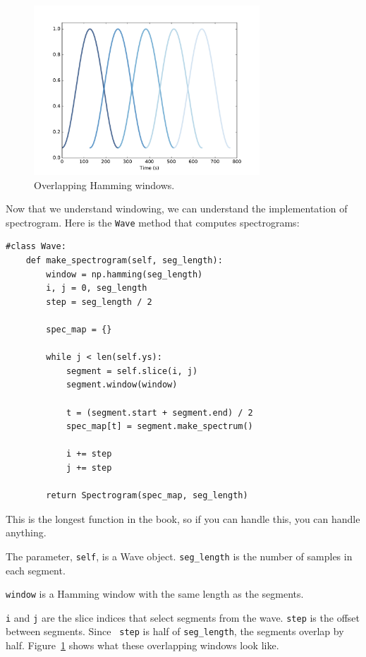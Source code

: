 \documentclass[12pt]{book}
\begin{document}
\begin{figure}
\centerline{\includegraphics[height=2.5in]{figs/windowing3.pdf}}
\caption{Overlapping Hamming windows.}
\label{fig.windowing3}
\end{figure}

Now that we understand windowing, we can understand the
implementation of spectrogram.
Here is the {\tt Wave} method that computes spectrograms:

\begin{verbatim}
#class Wave:
    def make_spectrogram(self, seg_length):
        window = np.hamming(seg_length)
        i, j = 0, seg_length
        step = seg_length / 2

        spec_map = {}

        while j < len(self.ys):
            segment = self.slice(i, j)
            segment.window(window)

            t = (segment.start + segment.end) / 2
            spec_map[t] = segment.make_spectrum()

            i += step
            j += step

        return Spectrogram(spec_map, seg_length)
\end{verbatim}

This is the longest function in the book, so if you can handle
this, you can handle anything.

The parameter, {\tt self}, is a Wave object.
\verb"seg_length" is the number of samples in each segment.

{\tt window} is a Hamming window with the same length as the segments.

{\tt i} and {\tt j} are the slice indices that select segments from
the wave.  {\tt step} is the offset between segments.  Since {\tt
  step} is half of \verb"seg_length", the segments overlap by half.
Figure~\ref{fig.windowing3} shows what these overlapping windows look
like.
\end{document}
